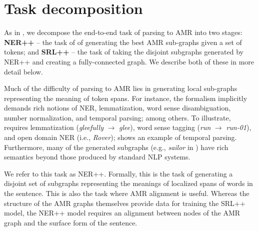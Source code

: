 \documentclass[11pt]{article}
\begin{document}
\section{Task decomposition}
As in , we decompose the end-to-end task of parsing to AMR into two stages:
  \textbf{NER++} -- the task of of generating the best AMR sub-graphs given a set of tokens; and
  \textbf{SRL++} -- the task of taking the disjoint subgraphs generated
  by NER++ and creating a fully-connected graph.
We describe both of these in more detail below.

Much of the difficulty of parsing to AMR lies in generating local sub-graphs representing the meaning of token spans.
For instance, the formalism implicitly demands rich notions of NER, lemmatization, word sense disambiguation, number normalization, and temporal parsing; among others.
To illustrate,  requires lemmatization (\textit{gleefully} $\rightarrow$ \textit{glee}), word sense tagging (\textit{run} $\rightarrow$ \textit{run-01}), and open domain NER (i.e., \textit{Rover});  shows an example of temporal parsing.
Furthermore, many of the generated subgraphs (e.g., \textit{sailor} in ) have rich semantics beyond those produced by standard NLP systems.

We refer to this task as NER++.
Formally, this is the task of generating a disjoint set of subgraphs representing the meanings of localized spans of words in the sentence.
This is also the task where AMR alignment is useful.
Whereas the structure of the AMR graphs themselves provide data for training the SRL++ model, the NER++ model requires an alignment between nodes of the AMR graph and the surface form of the sentence.

\end{document}
